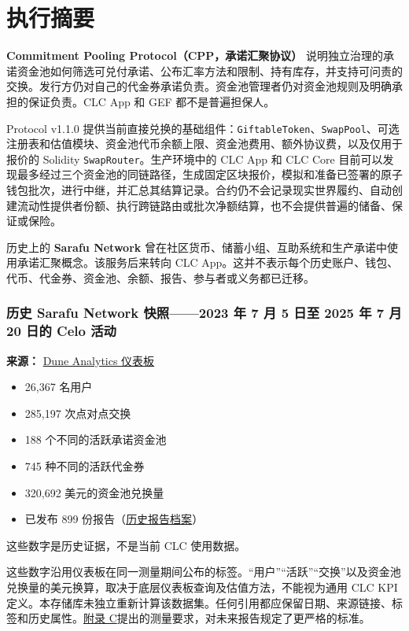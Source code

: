 \documentclass[11pt]{article}
\begin{document}
\section*{执行摘要}

\textbf{Commitment Pooling Protocol（CPP，承诺汇聚协议）} 说明独立治理的承诺资金池如何筛选可兑付承诺、公布汇率方法和限制、持有库存，并支持可问责的交换。发行方仍对自己的代金券承诺负责。资金池管理者仍对资金池规则及明确承担的保证负责。CLC App 和 GEF 都不是普遍担保人。

Protocol v1.1.0 提供当前直接兑换的基础组件：\texttt{GiftableToken}、\texttt{SwapPool}、可选注册表和估值模块、资金池代币余额上限、资金池费用、额外协议费，以及仅用于报价的 Solidity \texttt{SwapRouter}。生产环境中的 CLC App 和 CLC Core 目前可以发现最多经过三个资金池的同链路径，生成固定区块报价，模拟和准备已签署的原子钱包批次，进行中继，并汇总其结算记录。合约仍不会记录现实世界履约、自动创建流动性提供者份额、执行跨链路由或批次净额结算，也不会提供普遍的储备、保证或保险。

历史上的 \textbf{Sarafu Network} 曾在社区货币、储蓄小组、互助系统和生产承诺中使用承诺汇聚概念。该服务后来转向 CLC App。这并不表示每个历史账户、钱包、代币、代金券、资金池、余额、报告、参与者或义务都已迁移。

\subsubsection*{历史 Sarafu Network 快照------2023 年 7 月 5 日至 2025 年 7 月 20 日的 Celo 活动}

\textbf{来源：} \href{https://dune.com/grassrootseconomics/sarafu-network}{Dune Analytics 仪表板}

\begin{itemize}[leftmargin=*]
\item 26,367 名用户
\item 285,197 次点对点交换
\item 188 个不同的活跃承诺资金池
\item 745 种不同的活跃代金券
\item 320,692 美元的资金池兑换量
\item 已发布 899 份报告（\href{https://sarafu.network/reports}{历史报告档案}）
\end{itemize}
这些数字是历史证据，不是当前 CLC 使用数据。

这些数字沿用仪表板在同一测量期间公布的标签。``用户''``活跃''``交换''以及资金池兑换量的美元换算，取决于底层仪表板查询及估值方法，不能视为通用 CLC KPI 定义。本存储库未独立重新计算该数据集。任何引用都应保留日期、来源链接、标签和历史属性。\href{https://docs.cosmolocal.credit/zh/white-paper/appendix-c-kpi-definitions}{附录 C}提出的测量要求，对未来报告规定了更严格的标准。
\end{document}
